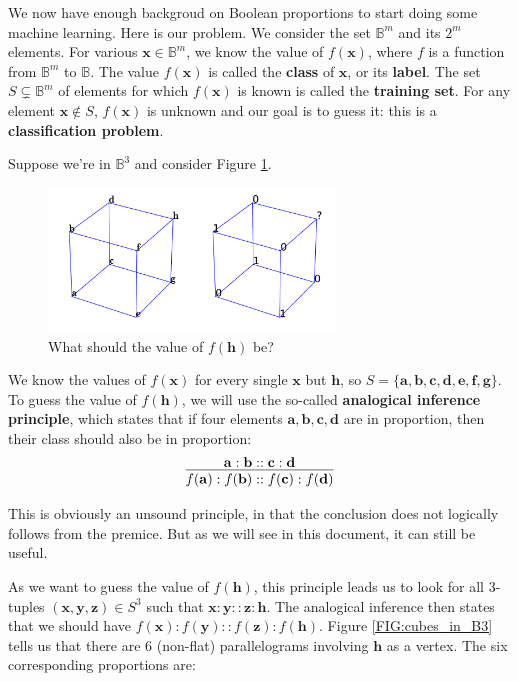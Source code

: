We now have enough backgroud on Boolean proportions to start doing some machine
learning. Here is our problem. We consider the set $\mathbb{B}^m$ and its $2^m$
elements. For various $\mathbf{x} \in \mathbb{B}^m$, we know the value of
$f(\mathbf{x})$, where $f$ is a function from $\mathbb{B}^m$ to $\mathbb{B}$.
The value $f(\mathbf{x})$ is called the \textbf{class} of $\mathbf{x}$, or its
\textbf{label}. The set $S \subsetneq \mathbb{B}^m$ of elements for which
$f(\mathbf{x})$ is known is called the \textbf{training set}. For any element
$\mathbf{x} \notin S$, $f(\mathbf{x})$ is unknown and our goal is to guess it:
this is a \textbf{classification problem}.

Suppose we're in $\mathbb{B}^3$ and consider Figure
\ref{FIG:classification_problem}.
\begin{figure}[!h]
\centering
  \includegraphics[width=3in]{figures/classification_problem.pdf}
  \caption{What should the value of $f(\mathbf{h})$ be?}
\label{FIG:classification_problem}
\end{figure}
We know the values of $f(\mathbf{x})$ for
every single $\mathbf{x}$ but $\mathbf{h}$, so $S = \{ \mathbf{a}, \mathbf{b},
\mathbf{c}, \mathbf{d}, \mathbf{e}, \mathbf{f}, \mathbf{g}\}$. To guess the
value of $f(\mathbf{h})$, we will use the so-called \textbf{analogical
inference principle}, which states that if four elements $\mathbf{a},
\mathbf{b}, \mathbf{c}, \mathbf{d}$ are in proportion, then their class should
also be in proportion:
$$
\infer{f(\mathbf{a}) : f(\mathbf{b}) :: f(\mathbf{c})
: f(\mathbf{d})}{\mathbf{a} : \mathbf{b} :: \mathbf{c} : \mathbf{d}}
$$

This is obviously an unsound principle, in that the conclusion does not
logically follows from the premice. But as we will see in this document, it can
still be useful.

As we want to guess the value of $f(\mathbf{h})$, this principle leads us to
look for all 3-tuples $(\mathbf{x}, \mathbf{y}, \mathbf{z}) \in S^3$ such that
$\mathbf{x}:\mathbf{y}::\mathbf{z}:\mathbf{h}$.  The analogical inference then
states that we should have
$f(\mathbf{x}):f(\mathbf{y})::f(\mathbf{z}):f(\mathbf{h})$. Figure
\ref{FIG:cubes_in_B3} tells us that there are 6 (non-flat) parallelograms
involving $\mathbf{h}$ as a vertex. The six corresponding proportions are:

